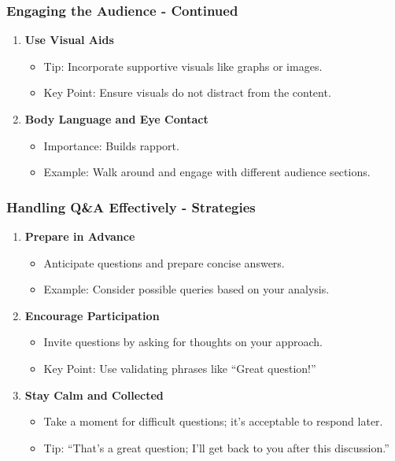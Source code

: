 \documentclass{beamer}
\begin{document}
\begin{frame}[fragile]
    \frametitle{Engaging the Audience - Continued}
    \begin{enumerate}[resume]
        \item \textbf{Use Visual Aids}
        \begin{itemize}
            \item Tip: Incorporate supportive visuals like graphs or images.
            \item Key Point: Ensure visuals do not distract from the content.
        \end{itemize}
        
        \item \textbf{Body Language and Eye Contact}
        \begin{itemize}
            \item Importance: Builds rapport.
            \item Example: Walk around and engage with different audience sections.
        \end{itemize}
    \end{enumerate}
\end{frame}

\begin{frame}[fragile]
    \frametitle{Handling Q\&A Effectively - Strategies}
    \begin{enumerate}
        \item \textbf{Prepare in Advance}
        \begin{itemize}
            \item Anticipate questions and prepare concise answers.
            \item Example: Consider possible queries based on your analysis.
        \end{itemize}
        
        \item \textbf{Encourage Participation}
        \begin{itemize}
            \item Invite questions by asking for thoughts on your approach.
            \item Key Point: Use validating phrases like “Great question!”
        \end{itemize}
        
        \item \textbf{Stay Calm and Collected}
        \begin{itemize}
            \item Take a moment for difficult questions; it’s acceptable to respond later.
            \item Tip: “That’s a great question; I’ll get back to you after this discussion.”
        \end{itemize}
    \end{enumerate}
\end{frame}
\end{document}
